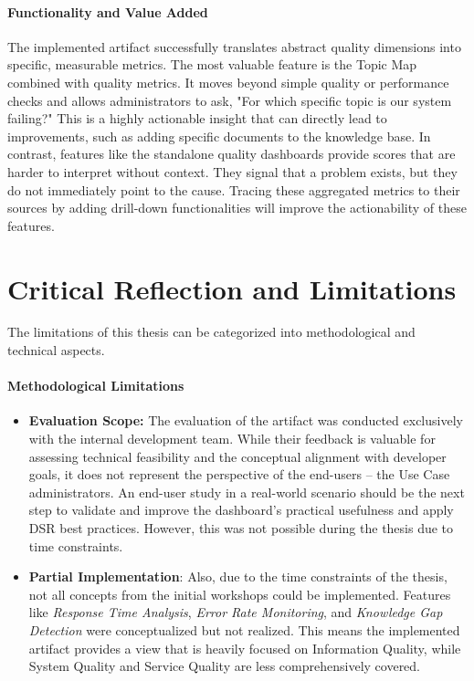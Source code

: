 \documentclass[
	english,
	ruledheaders=section,%
	class=report,%
	thesis={type=bachelor},%
	accentcolor=1b,%
	custommargins=true,%
	marginpar=false,%
	parskip=half-,%
	fontsize=11pt,%
	DIV=14,
]{tudapub}
\begin{document}
\paragraph{Functionality and Value Added} The implemented artifact successfully translates abstract quality dimensions into specific, measurable metrics. The most valuable feature is the Topic Map combined with quality metrics. It moves beyond simple quality or performance checks and allows administrators to ask, "For which specific topic is our system failing?" This is a highly actionable insight that can directly lead to improvements, such as adding specific documents to the knowledge base. In contrast, features like the standalone quality dashboards provide scores that are harder to interpret without context. They signal that a problem exists, but they do not immediately point to the cause. Tracing these aggregated metrics to their sources by adding drill-down functionalities will improve the actionability of these features.

\section{Critical Reflection and Limitations}
The limitations of this thesis can be categorized into methodological and technical aspects.

\paragraph{Methodological Limitations}
\begin{itemize}
    \item \textbf{Evaluation Scope:} The evaluation of the artifact was conducted exclusively with the internal development team. While their feedback is valuable for assessing technical feasibility and the conceptual alignment with developer goals, it does not represent the perspective of the end-users -- the Use Case administrators. An end-user study in a real-world scenario should be the next step to validate and improve the dashboard's practical usefulness and apply DSR best practices. However, this was not possible during the thesis due to time constraints.
    \item \textbf{Partial Implementation}: Also, due to the time constraints of the thesis, not all concepts from the initial workshops could be implemented. Features like \textit{Response Time Analysis}, \textit{Error Rate Monitoring}, and \textit{Knowledge Gap Detection} were conceptualized but not realized. This means the implemented artifact provides a view that is heavily focused on Information Quality, while System Quality and Service Quality are less comprehensively covered.
\end{itemize}
\end{document}

